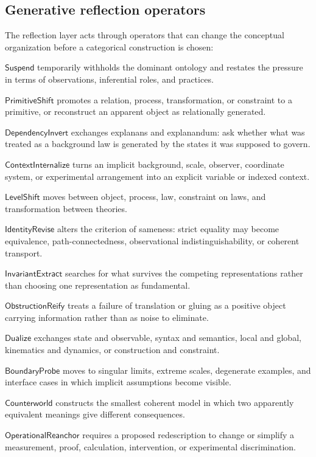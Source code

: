 \documentclass[11pt]{article}
\begin{document}
\subsection{Generative reflection operators}

The reflection layer acts through operators that can change the conceptual organization before a
categorical construction is chosen:
\begin{description}[leftmargin=3.2cm,style=nextline]
  \item[Ontological suspension.] \(\mathsf{Suspend}\) temporarily withholds the dominant ontology and restates the pressure in
  terms of observations, inferential roles, and practices.
  \item[Primitive shift.] \(\mathsf{PrimitiveShift}\) promotes a relation, process, transformation, or constraint to a
  primitive, or reconstruct an apparent object as relationally generated.
  \item[Dependency inversion.] \(\mathsf{DependencyInvert}\) exchanges explanans and explanandum: ask whether what was treated
  as a background law is generated by the states it was supposed to govern.
  \item[Context internalization.] \(\mathsf{ContextInternalize}\) turns an implicit background, scale, observer, coordinate
  system, or experimental arrangement into an explicit variable or indexed context.
  \item[Level shift.] \(\mathsf{LevelShift}\) moves between object, process, law, constraint on laws, and
  transformation between theories.
  \item[Identity revision.] \(\mathsf{IdentityRevise}\) alters the criterion of sameness: strict equality may become
  equivalence, path-connectedness, observational indistinguishability, or coherent transport.
  \item[Invariant extraction.] \(\mathsf{InvariantExtract}\) searches for what survives the competing representations rather
  than choosing one representation as fundamental.
  \item[Obstruction reification.] \(\mathsf{ObstructionReify}\) treats a failure of translation or gluing as a positive object
  carrying information rather than as noise to eliminate.
  \item[Dualization.] \(\mathsf{Dualize}\) exchanges state and observable, syntax and semantics, local and global,
  kinematics and dynamics, or construction and constraint.
  \item[Boundary probing.] \(\mathsf{BoundaryProbe}\) moves to singular limits, extreme scales, degenerate examples, and
  interface cases in which implicit assumptions become visible.
  \item[Counterworld construction.] \(\mathsf{Counterworld}\) constructs the smallest coherent model in which two apparently
  equivalent meanings give different consequences.
  \item[Operational reanchoring.] \(\mathsf{OperationalReanchor}\) requires a proposed redescription to change or simplify a
  measurement, proof, calculation, intervention, or experimental discrimination.
\end{description}
\end{document}
